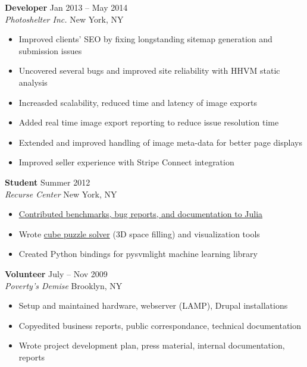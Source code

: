 \documentclass[letterpaper,10pt]{article}
\begin{document}
\vspace{6pt}
\noindent\textbf{Developer} \hfill Jan 2013 -- May 2014 \\
\textit{Photoshelter Inc.} \hfill New York, NY
\begin{itemize}
    \item Improved clients' SEO by fixing longstanding sitemap generation and submission issues
    \item Uncovered several bugs and improved site reliability with HHVM static analysis
    \item Increasded scalability, reduced time and latency of image exports
    \item Added real time image export reporting to reduce issue resolution time
    \item Extended and improved handling of image meta-data for better page displays
    \item Improved seller experience with Stripe Connect integration
\end{itemize}

\vspace{6pt}
\noindent\textbf{Student} \hfill Summer 2012 \\
\textit{Recurse Center} \hfill New York, NY
\begin{itemize}
    \item \href{https://github.com/JuliaLang/julia/pulls?q=is\%3Apr+author\%3Adcampbell24}{Contributed benchmarks, bug reports, and documentation to Julia}
    \item Wrote \href{https://github.com/dcampbell24/cubes}{cube puzzle solver} (3D space filling) and visualization tools
    \item Created Python bindings for pysvmlight machine learning library
\end{itemize}

\vspace{6pt}
\noindent\textbf{Volunteer} \hfill  July -- Nov 2009 \\
\textit{Poverty's Demise} \hfill Brooklyn, NY
\begin{itemize}
    \item Setup and maintained hardware, webserver (LAMP), Drupal installations
    \item Copyedited business reports, public correspondance, technical documentation
    \item Wrote project development plan, press material, internal documentation, reports
\end{itemize}
\end{document}
